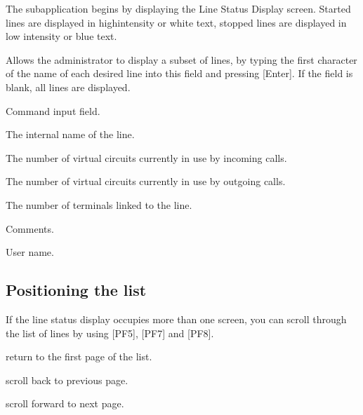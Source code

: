 \documentclass[letterpaper,10pt,english]{sphinxmanual}
\begin{document}
\sphinxAtStartPar
The sub\sphinxhyphen{}application begins by displaying the Line Status Display screen. Started lines are displayed in high\sphinxhyphen{}intensity or white text, stopped lines are displayed in low intensity or blue text.

\sphinxAtStartPar
{}

\sphinxAtStartPar
{}
\begin{description}
\sphinxAtStartPar
Allows the administrator to display a subset of lines, by typing the
first character of the name of each desired line into this field and
pressing {[}Enter{]}. If the field is blank, all lines are displayed.

\sphinxAtStartPar
Command input field.

\sphinxAtStartPar
The internal name of the line.

\sphinxAtStartPar
The number of virtual circuits currently in use by incoming calls.

\sphinxAtStartPar
The number of virtual circuits currently in use by outgoing calls.

\sphinxAtStartPar
The number of terminals linked to the line.

\sphinxAtStartPar
Comments.

\sphinxAtStartPar
User name.

\end{description}


\subsection{Positioning the list}
\label{\detokenize{audit_operations_ and_performance:positioning-the-list}}
\sphinxAtStartPar
If the line status display occupies more than one screen, you can scroll through the list of lines by using {[}PF5{]}, {[}PF7{]} and {[}PF8{]}.
\begin{description}
\sphinxlineitem{{[}PF5{]}}
\sphinxAtStartPar
return to the first page of the list.

\sphinxlineitem{{[}PF7{]}}
\sphinxAtStartPar
scroll back to previous page.

\sphinxlineitem{{[}PF8{]}}
\sphinxAtStartPar
scroll forward to next page.

\end{description}
\end{document}
